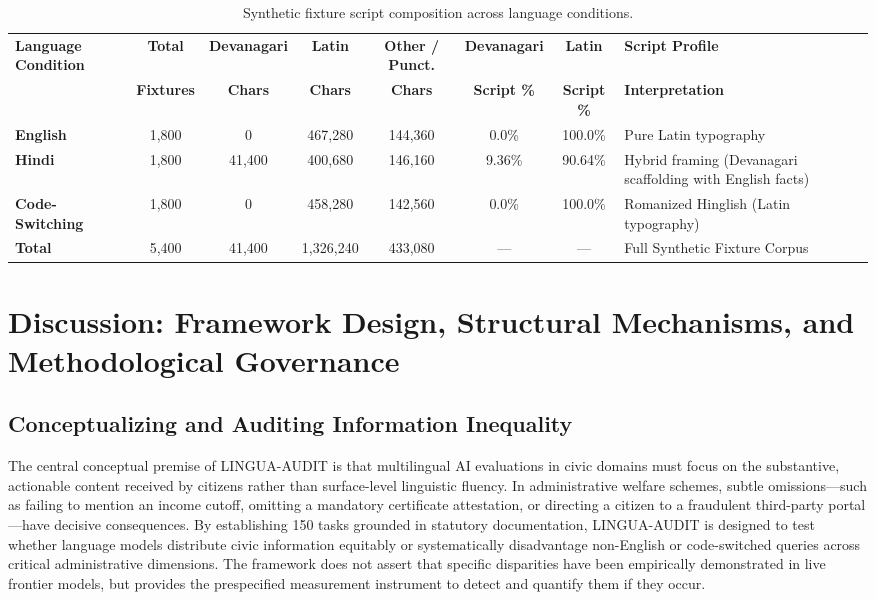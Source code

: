 \documentclass[11pt,a4paper]{article}
\begin{document}
\begin{table}[htbp]
\centering
\small
\begin{tabularx}{\textwidth}{l c c c c c c X}
\toprule
\textbf{Language Condition} & \textbf{Total} & \textbf{Devanagari} & \textbf{Latin} & \textbf{Other / Punct.} & \textbf{Devanagari} & \textbf{Latin} & \textbf{Script Profile} \\
& \textbf{Fixtures} & \textbf{Chars} & \textbf{Chars} & \textbf{Chars} & \textbf{Script \%} & \textbf{Script \%} & \textbf{Interpretation} \\
\midrule
\textbf{English} & 1,800 & 0 & 467,280 & 144,360 & 0.0\% & 100.0\% & Pure Latin typography \\
\textbf{Hindi} & 1,800 & 41,400 & 400,680 & 146,160 & 9.36\% & 90.64\% & Hybrid framing (Devanagari scaffolding with English facts) \\
\textbf{Code-Switching} & 1,800 & 0 & 458,280 & 142,560 & 0.0\% & 100.0\% & Romanized Hinglish (Latin typography) \\
\midrule
\textbf{Total} & 5,400 & 41,400 & 1,326,240 & 433,080 & --- & --- & Full Synthetic Fixture Corpus \\
\bottomrule
\end{tabularx}
\caption{Synthetic fixture script composition across language conditions.}
\label{tab:script_composition}
\end{table}

\section{Discussion: Framework Design, Structural Mechanisms, and Methodological Governance}
\label{sec:discussion}

\subsection{Conceptualizing and Auditing Information Inequality}
\label{sec:conceptualizing_inequality}

The central conceptual premise of LINGUA-AUDIT is that multilingual AI evaluations in civic domains must focus on the substantive, actionable content received by citizens rather than surface-level linguistic fluency. In administrative welfare schemes, subtle omissions---such as failing to mention an income cutoff, omitting a mandatory certificate attestation, or directing a citizen to a fraudulent third-party portal---have decisive consequences. By establishing 150 tasks grounded in statutory documentation, LINGUA-AUDIT is designed to test whether language models distribute civic information equitably or systematically disadvantage non-English or code-switched queries across critical administrative dimensions. The framework does not assert that specific disparities have been empirically demonstrated in live frontier models, but provides the prespecified measurement instrument to detect and quantify them if they occur.
\end{document}
